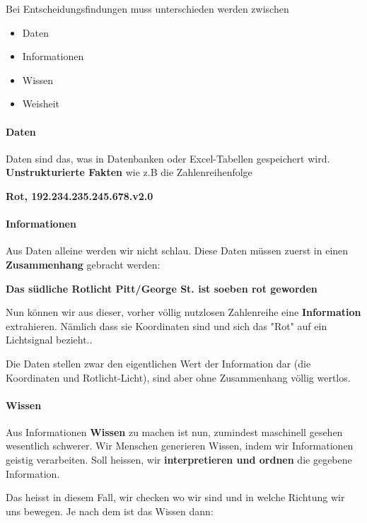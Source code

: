 \documentclass[a4paper, 11pt]{article}
\begin{document}
Bei Entscheidungsfindungen muss unterschieden werden zwischen

\begin{itemize}
	\item Daten
	\item Informationen
	\item Wissen
	\item Weisheit
\end{itemize}

\paragraph{Daten}
Daten sind das, was in Datenbanken oder Excel-Tabellen gespeichert wird. \textbf{Unstrukturierte Fakten} wie z.B die Zahlenreihenfolge 
\begin{center}
\textbf{	Rot, 192.234.235.245.678.v2.0}
\end{center}

\paragraph{Informationen}
Aus Daten alleine werden wir nicht schlau. Diese Daten müssen zuerst in einen \textbf{Zusammenhang} gebracht werden:

\begin{center}
\textbf{	Das südliche Rotlicht Pitt/George St. ist soeben rot geworden }
\end{center}

Nun können wir aus dieser, vorher völlig nutzlosen Zahlenreihe eine \textbf{Information} extrahieren. Nämlich dass sie Koordinaten sind und sich das "Rot" auf ein Lichtsignal bezieht..

Die Daten stellen zwar den eigentlichen Wert der Information dar (die Koordinaten und Rotlicht-Licht), sind aber ohne Zusammenhang völlig wertlos.

\paragraph{Wissen}
Aus Informationen \textbf{Wissen} zu machen ist nun, zumindest maschinell gesehen wesentlich schwerer. Wir Menschen generieren Wissen, indem wir Informationen geistig verarbeiten. Soll heissen, wir \textbf{interpretieren und ordnen} die gegebene Information.

Das heisst in diesem Fall, wir checken wo wir sind und in welche Richtung wir uns bewegen. Je nach dem ist das Wissen dann:
\end{document}
